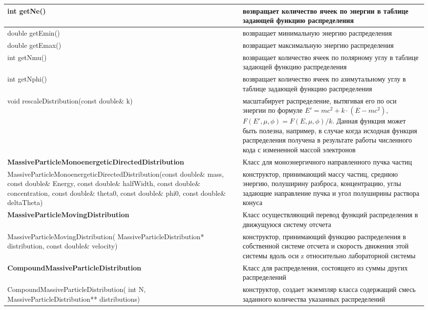 \begin{small}
\begin{xtabular}{|p{0.52\textwidth}|p{0.48\textwidth}|}
		\hline
		int getNe() & возвращает количество ячеек по энергии в таблице задающей функцию распределения\\
		\hline
		double getEmin() & возвращает минимальную энергию распределения\\
		\hline
		double getEmax() & возвращает максимальную энергию распределения\\
		\hline
		int getNmu() & возвращает количество ячеек по полярному углу в таблице задающей функцию распределения\\
		\hline
		int getNphi() & возвращает количество ячеек по азимутальному углу в таблице задающей функцию распределения\\
		\hline
		void rescaleDistribution(const double\& k) & масштабирует распределение, вытягивая его по оси энергии по формуле $E' = mc^2 + k\cdot(E-mc^2)$, $F(E',\mu, \phi)=F(E,\mu, \phi)/k$. Данная функция может быть полезна, например, в случае когда исходная функция распределения получена в результате работы численного кода с измененной массой электронов\\
		\hline
		\textbf{MassiveParticleMonoenergeticDirectedDistribution} & Класс для моноэнергичного направленного пучка частиц\\
		\hline
		MassiveParticleMonoenergeticDirectedDistribution(const double\& mass, const double\& Energy, const double\& halfWidth, const double\& concentration, const double\& theta0, const double\& phi0, const double\& deltaTheta) & конструктор, принимающий массу частиц, среднюю энергию, полуширину разброса, концентрацию, углы задающие направление пучка и угол полуширины раствора конуса\\
		\hline
		\textbf{MassiveParticleMovingDistribution} & Класс осуществляющий перевод функций распределения в движущуюся систему отсчета\\
		\hline
		MassiveParticleMovingDistribution( MassiveParticleDistribution* distribution, const double\& velocity) & конструктор, принимающий функцию распределения в собственной системе отсчета и скорость движения этой системы вдоль оси z относительно лабораторной системы\\
		\hline
		\textbf{CompoundMassiveParticleDistribution} & Класс для распределения, состоящего из суммы других распределений\\
		\hline
		CompoundMassiveParticleDistribution( int N, MassiveParticleDistribution** distributions) & конструктор, создает экземпляр класса содержащий смесь заданного количества указанных распределений\\
		\hline

\end{xtabular}
\end{small}
